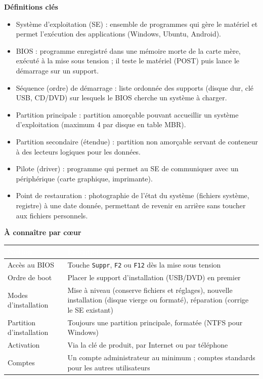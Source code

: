 \documentclass[11pt]{article}
\newcommand{\cle}[1]{{\popxbold\color{popdark}#1}}
\begin{document}
\begin{bilan}
\textbf{Définitions clés}
\begin{itemize}
  \item \cle{Système d'exploitation (SE)} : ensemble de programmes qui gère le matériel et permet l'exécution des applications (Windows, Ubuntu, Android).
  \item \cle{BIOS} : programme enregistré dans une mémoire morte de la carte mère, exécuté à la mise sous tension ; il teste le matériel (POST) puis lance le démarrage sur un support.
  \item \cle{Séquence (ordre) de démarrage} : liste ordonnée des supports (disque dur, clé USB, CD/DVD) sur lesquels le BIOS cherche un système à charger.
  \item \cle{Partition principale} : partition amorçable pouvant accueillir un système d'exploitation (maximum 4 par disque en table MBR).
  \item \cle{Partition secondaire (étendue)} : partition non amorçable servant de conteneur à des lecteurs logiques pour les données.
  \item \cle{Pilote (driver)} : programme qui permet au SE de communiquer avec un périphérique (carte graphique, imprimante).
  \item \cle{Point de restauration} : photographie de l'état du système (fichiers système, registre) à une date donnée, permettant de revenir en arrière sans toucher aux fichiers personnels.
\end{itemize}

\textbf{À connaître par c\oe ur}
\begin{center}
\begin{tabularx}{\linewidth}{|l|X|}
\hline
\rowcolor{popblue} \textcolor{white}{\textbf{Notion}} & \textcolor{white}{\textbf{Essentiel}} \\
\hline
Accès au BIOS & Touche \texttt{Suppr}, \texttt{F2} ou \texttt{F12} dès la mise sous tension \\
\hline
Ordre de boot & Placer le support d'installation (USB/DVD) en premier \\
\hline
Modes d'installation & Mise à niveau (conserve fichiers et réglages), nouvelle installation (disque vierge ou formaté), réparation (corrige le SE existant) \\
\hline
Partition d'installation & Toujours une partition principale, formatée (NTFS pour Windows) \\
\hline
Activation & Via la clé de produit, par Internet ou par téléphone \\
\hline
Comptes & Un compte administrateur au minimum ; comptes standards pour les autres utilisateurs \\
\hline
\end{tabularx}
\end{center}


\end{bilan}
\end{document}
